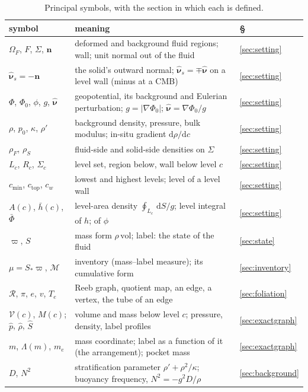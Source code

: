 \documentclass[11pt]{article}
\theoremstyle{definition}
\theoremstyle{remark}
\newcommand{\bn}{\mathbf{n}}
\newcommand{\dS}{\,\mathrm{d}S}
\newcommand{\Vol}{\mathcal V}
\newcommand{\Mcdf}{\mathcal M}
\newcommand{\vol}{\mathrm{vol}}
\newcommand{\nuh}{\hat{\boldsymbol{\nu}}}
\newcommand{\nuhs}{\hat{\boldsymbol{\nu}}_s}
\begin{document}
\begin{table}[!tb]
\centering\small
\caption{Principal symbols, with the section in which each is defined.}
\label{tab:symbols}
\begin{tabular}{@{}l p{} l@{}}
\toprule
symbol & meaning & \S \\
\midrule
$\Omega_F$, $F$, $\Sigma$, $\bn$ & deformed and background fluid regions; wall; unit normal out of the fluid & \ref{sec:setting} \\
$\nuhs = -\bn$ & the solid's outward normal; $\nuhs = \mp\nuh$ on a level wall (minus at a CMB) & \ref{sec:setting} \\
$\Phi$, $\Phi_0$, $\phi$, $g$, $\nuh$ & geopotential, its background and Eulerian perturbation; $g = |\nabla\Phi_0|$; $\nuh = \nabla\Phi_0/g$ & \ref{sec:setting} \\
$\rho$, $p_0$, $\kappa$, $\rho'$ & background density, pressure, bulk modulus; in-situ gradient $\mathrm d\rho/\mathrm dc$ & \ref{sec:setting} \\
$\rho_F$, $\rho_S$ & fluid-side and solid-side densities on $\Sigma$ & \ref{sec:setting} \\
$L_c$, $R_c$, $\Sigma_c$ & level set, region below, wall below level $c$ & \ref{sec:setting} \\
$c_{\min}$, $c_{\mathrm{top}}$, $c_w$ & lowest and highest levels; level of a level wall & \ref{sec:setting} \\
$A(c)$, $\bar h(c)$, $\bar\Phi$ & level-area density $\oint_{L_c}\dS/g$; level integral of $h$; of $\phi$ & \ref{sec:setting} \\
$\varpi$, $S$ & mass form $\rho\,\vol$; label: the state of the fluid & \ref{sec:state} \\
$\mu = S_*\varpi$, $\Mcdf$ & inventory (mass--label measure); its cumulative form & \ref{sec:inventory} \\
$\mathcal R$, $\pi$, $e$, $v$, $T_e$ & Reeb graph, quotient map, an edge, a vertex, the tube of an edge & \ref{sec:foliation} \\
$\Vol(c)$, $M(c)$; $\hat p$, $\hat\rho$, $\hat S$ & volume and mass below level $c$; pressure, density, label profiles & \ref{sec:exactgraph} \\
$m$, $\Lambda(m)$, $m_e$ & mass coordinate; label as a function of it (the arrangement); pocket mass & \ref{sec:exactgraph} \\
$D$, $N^2$ & stratification parameter $\rho' + \rho^2/\kappa$; buoyancy frequency, $N^2 = -g^2D/\rho$ & \ref{sec:background} \\

\end{tabular}
\end{table}
\end{document}
